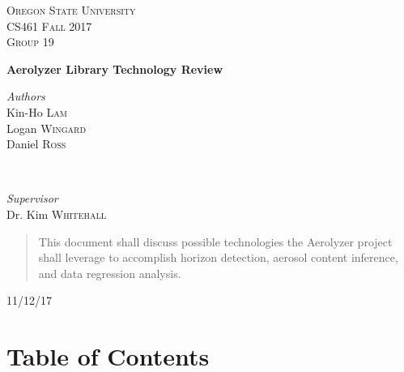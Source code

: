 \documentclass[journal,10pt,draftclsnofoot,onecolumn]{IEEEtran}
\begin{document}
	\begin{titlepage}

	\center

	\textsc{\LARGE Oregon State University}\\[1.5cm]
	\textsc{\Large CS461 Fall 2017 }\\[0.5cm]
	\textsc{\large Group 19}\\[0.5cm] %

	\vfill

	{\huge\bfseries Aerolyzer Library Technology Review}\\[0.4cm]

	\vfill

	\begin{minipage}{0.4\textwidth}
		\begin{flushleft}
			\large
			\textit{Authors}\\
			Kin-Ho \textsc{Lam}\\
			Logan \textsc{Wingard}\\
			Daniel \textsc{Ross}\\
		\end{flushleft}
	\end{minipage}
	~
	\begin{minipage}{0.4\textwidth}
		\begin{flushright}
			\large
			\textit{Supervisor}\\
			Dr. Kim \textsc{Whitehall}
		\end{flushright}
	\end{minipage}

	\vfill

	\begin{abstract}
		\begin{singlespace}
			This document shall discuss possible technologies the Aerolyzer project shall leverage to accomplish horizon detection, aerosol content inference, and data regression analysis.
		\end{singlespace}
	\end{abstract}

	\vfill
	\vfill
	\vfill
	{\large11/12/17}
	\vfill
\end{titlepage}

\section{Table of Contents}
\tableofcontents
\clearpage
\end{document}
